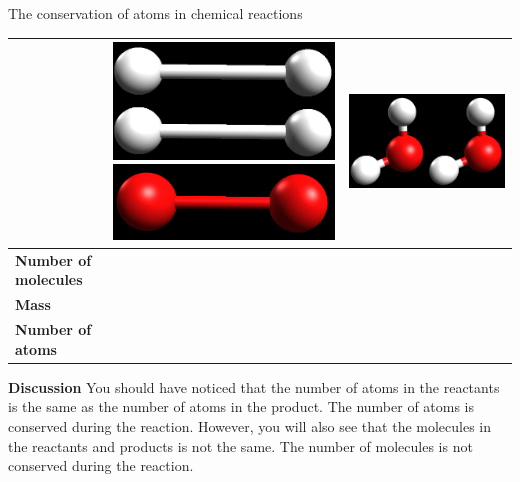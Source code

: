 \begin{activity}{The conservation of atoms in chemical reactions }
\begin{table}[H]
\begin{center}
\begin{tabular}{|l|l||l|}
& \includegraphics[width=.1\textwidth]{photos/hydrogen.png} \includegraphics[width=.1\textwidth]{photos/oxygen.png} & \includegraphics[width=.1\textwidth]{photos/water.png} \\ \hline
   \textbf{Number of molecules} &  &  \\ \hline
\textbf{Mass} &  &  \\ \hline
\textbf{Number of atoms} &  &  \\ \hline
  \end{tabular}

 \end{center}

\end{table}

      \label{m38711*id65031}\noindent{}\textbf{Discussion}
     You should have noticed that the number of atoms in the reactants is the same as the number of atoms in the product. The number of atoms is conserved during the reaction. However, you will also see that the molecules in the reactants and products is not the same. The number of molecules is not conserved during the reaction.
 \par 
\end{activity}
\label{m38711*eip-14}
